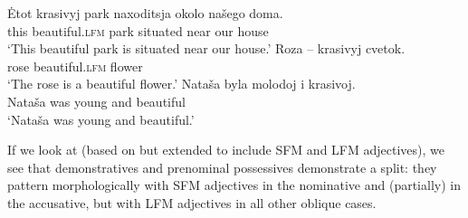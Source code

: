 \documentclass[output=paper,
colorlinks,
citecolor=brown,
newtxmath
]{langscibook}
\begin{document}

\ea\label{lfm_attpred}
    \ea \gll Ėtot krasivyj park naxoditsja okolo našego doma.\\
    this beautiful.\textsc{lfm} park situated near our house\\
    \glt `This beautiful park is situated near our house.'
    \ex \gll Roza -- krasivyj cvetok.\\
    rose {}{} beautiful.\textsc{lfm} flower\\
    \glt `The rose is a beautiful flower.'
    \ex \gll Nataša byla molodoj i krasivoj.\\
    Nataša was young and beautiful\\
    \glt `Nataša was young and beautiful.'
\z\z

\noindent If we look at  (based on \citealt{Pereltsvaig2007} but extended to include SFM and LFM adjectives), we see that demonstratives and prenominal possessives demonstrate a split: they pattern morphologically with SFM adjectives in the nominative and (partially) in the accusative, but with LFM adjectives in all other oblique cases.

\end{document}
